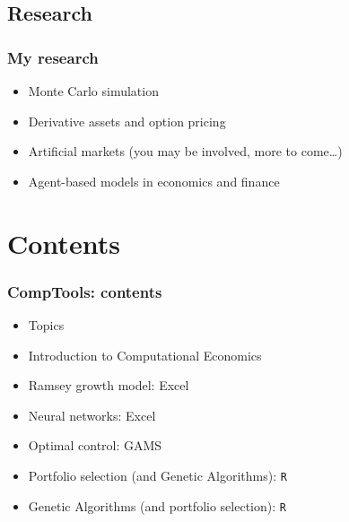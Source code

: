 \documentclass[ps,CFframes_inst]{beamer}
\begin{document}
\subsection{Research}
\begin{frame}
    \frametitle{My research}

\begin{itemize}
	    \item<1-> Monte Carlo simulation
	    	    
	    \item<2-> Derivative assets and option pricing
	    
	    \item<3-> Artificial markets \alert<3>{(you may be 
	    involved, more to come\ldots)}
	    
	    \item<4-> Agent-based models in economics and finance
	    
	\end{itemize}
\end{frame}

\section{Contents}
\begin{frame}
    \frametitle{CompTools: contents}
 \begin{itemize}
     
     \item[] Topics
     
	 \item Introduction to Computational Economics
     
         \item Ramsey growth model: Excel
	 
	 \item Neural networks: Excel
	 
	 \item Optimal control: GAMS
	 
	 \item Portfolio selection (and Genetic Algorithms): \texttt{R}
	 
	 \item Genetic Algorithms (and portfolio selection): \texttt{R}
     \end{itemize}
\end{frame}



\end{document}
